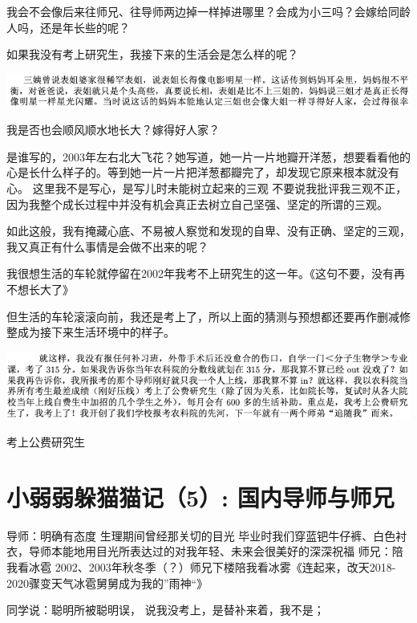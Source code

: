 \documentclass[9pt, b5paper]{article}
\begin{document}
我会不会像后来往师兄、往导师两边掉一样掉进哪里？会成为小三吗？会嫁给同龄人吗，还是年长些的呢？

如果我没有考上研究生，我接下来的生活会是怎么样的呢？

\begin{center}
\includegraphics[width=.9\linewidth]{./pic/backups_plans_20210422_095219.png}
\end{center}

我是否也会顺风顺水地长大？嫁得好人家？

是谁写的，2003年左右北大飞花？她写道，她一片一片地瓣开洋葱，想要看看他的心是长什么样子的。等到她一片一片把洋葱都瓣完了，却发现它原来根本就没有心。
这里我不是写心，是写儿时未能树立起来的三观
不要说我批评我三观不正，因为我整个成长过程中并没有机会真正去树立自己坚强、坚定的所谓的三观。

如此这般，我有掩藏心底、不易被人察觉和发现的自卑、没有正确、坚定的三观，我又真正有什么事情是会做不出来的呢？


我很想生活的车轮就停留在2002年我考不上研究生的这一年。《这句不要，没有再不想长大了》

但生活的车轮滚滚向前，我还是考上了，所以上面的猜测与预想都还要再作删减修整成为接下来生活环境中的样子。

\begin{center}
\includegraphics[width=.9\linewidth]{./pic/backups_plans_20210422_095512.png}
\end{center}

考上公费研究生

\section{小弱弱躲猫猫记（5）: 国内导师与师兄}
\label{sec:orgf53f619}
导师：明确有态度
生理期间曾经那关切的目光
毕业时我们穿蓝钯牛仔裤、白色衬衣，导师本能地用目光所表达过的对我年轻、未来会很美好的深深祝福
师兄：陪我看冰雹
2002、2003年秋冬季（？）师兄下楼陪我看冰雾《连起来，改天2018-2020骤变天气冰雹舅舅成为我的”雨神“》

同学说：聪明所被聪明误，
说我没考上，是替补来着，我不是；
\end{document}
